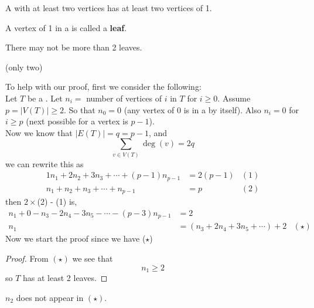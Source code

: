 \documentclass[english, 11pt]{article}
\begin{document}
\begin{thrm}
  A  with at least two vertices has at least two vertices of  1.
\end{thrm}
\begin{defn}[leaf]\label{leaf}
A vertex of  1 in a  is called a \textbf{leaf}.
\end{defn}
\begin{note}
  There may not be more than 2 leaves.
\end{note}
  \begin{center}
  (only two)
\end{center}
To help with our proof, first we consider the following: \\

  Let $T$ be a . Let $n_i = $ number of vertices of  $i$ in $T$ for $i \geq 0$. Assume $p = |V(T)| \geq 2$. So that $n_0 = 0$ (any vertex of  0 is in a  by itself). Also $n_i = 0$ for $i \geq p$ (next possible  for a vertex is $p - 1$). \\

  Now we know that $|E(T)| = q = p - 1$, and
  \[ \sum_{v \in V(T)} \deg(v) = 2q \]
  we can rewrite this as
  \begin{align*}
    1n_1 + 2n_2 + 3n_3 + \cdots + (p-1)n_{p-1} & = 2(p-1) & (1) \\
    n_1 + n_2 + n_3 + \cdots + n_{p-1} & = p & (2)
  \end{align*}
  then $2\times$(2) - (1) is,
  \begin{align*}
      n_1 + 0 - n_3 - 2n_4 - 3n_5 - \cdots - (p-3)n_{p-1} & = 2 \\
      n_1 & = (n_3 + 2n_4 + 3n_5 + \cdots) + 2 & (\star)
   \end{align*}
   Now we start the proof since we have ($\star$)
   \begin{proof}
   From $(\star)$ we see that
   \[ n_1 \geq 2 \]
   so $T$ has at least 2 leaves.
\end{proof}
\begin{note}
  $n_2$ does not appear in $(\star)$.
\end{note}
\end{document}
